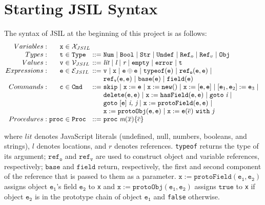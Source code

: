 \documentclass[a4paper,11pt,twoside]{report}
\begin{document}
\section{Starting JSIL Syntax}
The syntax of JSIL at the beginning of this project is as follows:
$$
\arraycolsep=1.5pt
\begin{array}{rrclcl}
Variables : &  \mathtt{x} & \in & \mathcal{X}_{JSIL} \\
Types: & \mathtt{t} & \in & \mathtt{Type} & ::= & \mathtt{Num} \myor \mathtt{Bool} \myor \mathtt{Str} \myor \mathtt{Undef} \myor \mathtt{Ref}_o \myor \mathtt{Ref}_v \myor \mathtt{Obj} \\
Values: & \mathtt{v} & \in & \mathcal{V}_{JSIL} & ::= &\textit{lit} \myor \textit{l} \myor \textit{r} \myor \mathtt{empty} \myor \mathtt{error} \myor \mathtt{t} \\
Expressions: & \mathtt{e} & \in & \mathcal{E}_{JSIL} & ::= &\mathtt{v} \myor \mathtt{x} \myor \mathtt{e} \oplus \mathtt{e} \myor \mathtt{typeof}(\mathtt{e}) \myor \mathtt{ref_o}(\mathtt{e,e}) \myor \\
& & & & & \mathtt{ref_v}(\mathtt{e,e}) \myor \mathtt{base}(\mathtt{e}) \myor \mathtt{field}(\mathtt{e}) 
\\
Commands: & \mathtt{c} & \in & \mathtt{Cmd} & ::= & \mathtt{skip} \myor \mathtt{x} := \mathtt{e} \myor \mathtt{x} := \mathtt{new}() \myor \mathtt{x} := [\mathtt{e,e}] \myor [\mathtt{e}_1,\mathtt{e}_2] := \mathtt{e}_3 \myor  \\
& & & & & \mathtt{delete}(\mathtt{e,e}) \myor \mathtt{x} := \mathtt{hasField}(\mathtt{e,e}) \myor \mathtt{goto} \hspace{3pt} \textit{i} \myor \\
& & & & & \mathtt{goto} \hspace{3pt} [\mathtt{e}] \hspace{3pt} \textit{i, j} \myor \mathtt{x} := \mathtt{protoField} (\mathtt{e,e}) \myor \\
& & & & & \mathtt{x} := \mathtt{protoObj}(\mathtt{e,e}) \myor \mathtt{x} := \mathtt{e}(\overline{e})\ \mathtt{with}\ \textit{j}
\\
Procedures: & \mathtt{proc} & \in & \mathtt{Proc} & ::= & \mathtt{proc} \hspace{3pt} \textit{m}(\overline{x})\{\overline{c}\}
\end{array}
$$

where $lit$ denotes JavaScript literals (undefined, null, numbers, booleans, and strings), $l$ denotes locations, and $r$ denotes references. \texttt{typeof} returns the type of its argument; $\mathtt{ref_o}$ and $\mathtt{ref_v}$ are used to construct object and variable references, respectively; $\mathtt{base}$ and $\mathtt{field}$ return, respectively, the first and second component of the reference that is passed to them as a parameter. $\mathtt{x := protoField(e_1, e_2)}$ assigns object $\mathtt{e_1}$'s field $\mathtt{e_2}$ to \texttt{x} and $\mathtt{x := protoObj(e_1, e_2)}$ assigns $\mathtt{true}$ to \texttt{x} if object $\mathtt{e_2}$ is in the prototype chain of object $\mathtt{e_1}$ and \texttt{false} otherwise.
\end{document}
